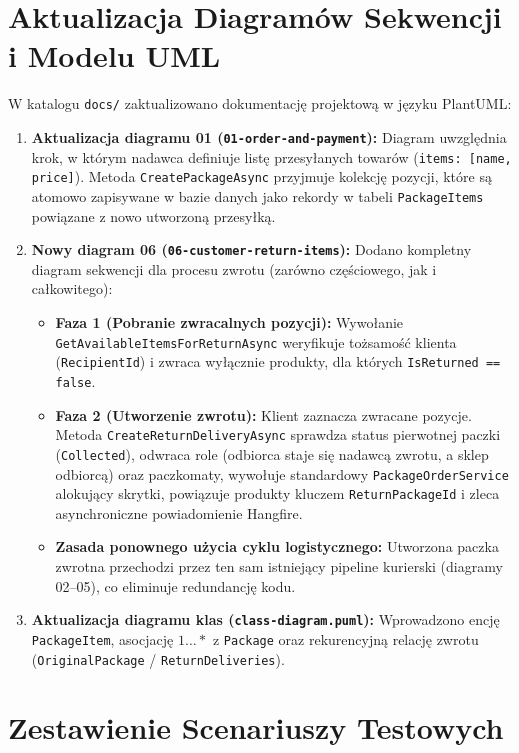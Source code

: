 \documentclass[10.5pt,a4paper]{article}
\begin{document}
\section{Aktualizacja Diagramów Sekwencji i Modelu UML}

W katalogu \texttt{docs/} zaktualizowano dokumentację projektową w języku PlantUML:
\begin{enumerate}[leftmargin=*,itemsep=2pt]
    \item \textbf{Aktualizacja diagramu 01 (\texttt{01-order-and-payment}):}
    Diagram uwzględnia krok, w którym nadawca definiuje listę przesyłanych towarów (\texttt{items: [name, price]}). Metoda \texttt{CreatePackageAsync} przyjmuje kolekcję pozycji, które są atomowo zapisywane w bazie danych jako rekordy w tabeli \texttt{PackageItems} powiązane z nowo utworzoną przesyłką.
    \item \textbf{Nowy diagram 06 (\texttt{06-customer-return-items}):}
    Dodano kompletny diagram sekwencji dla procesu zwrotu (zarówno częściowego, jak i całkowitego):
    \begin{itemize}[itemsep=1pt]
        \item \textbf{Faza 1 (Pobranie zwracalnych pozycji):} Wywołanie \texttt{GetAvailableItemsForReturnAsync} weryfikuje tożsamość klienta (\texttt{RecipientId}) i zwraca wyłącznie produkty, dla których \texttt{IsReturned == false}.
        \item \textbf{Faza 2 (Utworzenie zwrotu):} Klient zaznacza zwracane pozycje. Metoda \texttt{CreateReturnDeliveryAsync} sprawdza status pierwotnej paczki (\texttt{Collected}), odwraca role (odbiorca staje się nadawcą zwrotu, a sklep odbiorcą) oraz paczkomaty, wywołuje standardowy \texttt{PackageOrderService} alokujący skrytki, powiązuje produkty kluczem \texttt{ReturnPackageId} i zleca asynchroniczne powiadomienie Hangfire.
        \item \textbf{Zasada ponownego użycia cyklu logistycznego:} Utworzona paczka zwrotna przechodzi przez ten sam istniejący pipeline kurierski (diagramy 02--05), co eliminuje redundancję kodu.
    \end{itemize}
    \item \textbf{Aktualizacja diagramu klas (\texttt{class-diagram.puml}):} Wprowadzono encję \texttt{PackageItem}, asocjację $1 \dots *$ z \texttt{Package} oraz rekurencyjną relację zwrotu (\texttt{OriginalPackage} / \texttt{ReturnDeliveries}).
\end{enumerate}

\newpage
\section{Zestawienie Scenariuszy Testowych}
\end{document}
